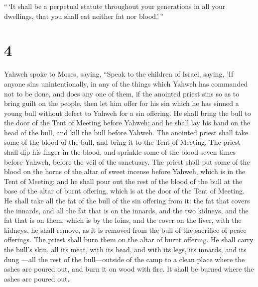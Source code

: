  ``\,`It shall be a perpetual statute throughout your
generations in all your dwellings, that you shall eat neither fat nor
blood.'\,''

\hypertarget{section-3}{%
\section{4}\label{section-3}}

 Yahweh spoke to Moses, saying,  ``Speak to
the children of Israel, saying, 'If anyone sins unintentionally, in any
of the things which Yahweh has commanded not to be done, and does any
one of them,  if the anointed priest sins so as to bring
guilt on the people, then let him offer for his sin which he has sinned
a young bull without defect to Yahweh for a sin offering. 
He shall bring the bull to the door of the Tent of Meeting before
Yahweh; and he shall lay his hand on the head of the bull, and kill the
bull before Yahweh.  The anointed priest shall take some
of the blood of the bull, and bring it to the Tent of Meeting.
 The priest shall dip his finger in the blood, and
sprinkle some of the blood seven times before Yahweh, before the veil of
the sanctuary.  The priest shall put some of the blood on
the horns of the altar of sweet incense before Yahweh, which is in the
Tent of Meeting; and he shall pour out the rest of the blood of the bull
at the base of the altar of burnt offering, which is at the door of the
Tent of Meeting.  He shall take all the fat of the bull of
the sin offering from it: the fat that covers the innards, and all the
fat that is on the innards,  and the two kidneys, and the
fat that is on them, which is by the loins, and the cover on the liver,
with the kidneys, he shall remove,  as it is removed from
the bull of the sacrifice of peace offerings. The priest shall burn them
on the altar of burnt offering.  He shall carry the
bull's skin, all its meat, with its head, and with its legs, its
innards, and its dung  ---all the rest of the
bull---outside of the camp to a clean place where the ashes are poured
out, and burn it on wood with fire. It shall be burned where the ashes
are poured out.


